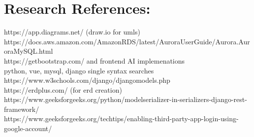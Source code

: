 \documentclass{article}
\begin{document}
	\section*{Research References:}
	https://app.diagrams.net/ (draw.io for umls) \\
	https://docs.aws.amazon.com/AmazonRDS/latest/AuroraUserGuide/Aurora.AuroraMySQL.html \\
	https://getbootstrap.com/ and frontend AI implemenations\\
	python, vue, mysql, django single syntax searches \\
	https://www.w3schools.com/django/djangomodels.php \\
	https://erdplus.com/ (for erd creation)\\
	https://www.geeksforgeeks.org/python/modelserializer-in-serializers-django-rest-framework/ \\
	https://www.geeksforgeeks.org/techtips/enabling-third-party-app-login-using-google-account/ \\
	
	
	
\end{document}
